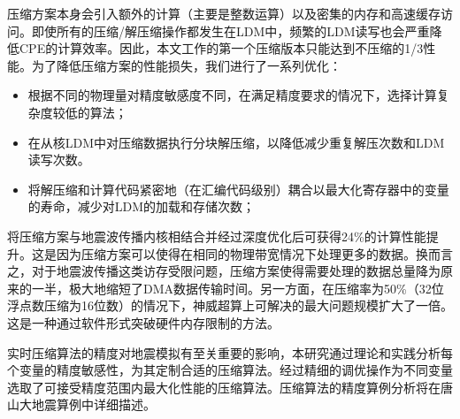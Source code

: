 压缩方案本身会引入额外的计算（主要是整数运算）以及密集的内存和高速缓存访问。即使所有的压缩/解压缩操作都发生在LDM中，频繁的LDM读写也会严重降低CPE的计算效率。因此，本文工作的第一个压缩版本只能达到不压缩的1/3性能。为了降低压缩方案的性能损失，我们进行了一系列优化：

\begin{itemize}
  \item 根据不同的物理量对精度敏感度不同，在满足精度要求的情况下，选择计算复杂度较低的算法；
  \item 在从核LDM中对压缩数据执行分块解压缩，以降低减少重复解压次数和LDM读写次数。
  \item 将解压缩和计算代码紧密地（在汇编代码级别）耦合以最大化寄存器中的变量的寿命，减少对LDM的加载和存储次数；
\end{itemize}

将压缩方案与地震波传播内核相结合并经过深度优化后可获得24\%的计算性能提升。这是因为压缩方案可以使得在相同的物理带宽情况下处理更多的数据。换而言之，对于地震波传播这类访存受限问题，压缩方案使得需要处理的数据总量降为原来的一半，极大地缩短了DMA数据传输时间。另一方面，在压缩率为50\%（32位浮点数压缩为16位数）的情况下，神威超算上可解决的最大问题规模扩大了一倍。这是一种通过软件形式突破硬件内存限制的方法。

实时压缩算法的精度对地震模拟有至关重要的影响，本研究通过理论和实践分析每个变量的精度敏感性，为其定制合适的压缩算法。经过精细的调优操作为不同变量选取了可接受精度范围内最大化性能的压缩算法。压缩算法的精度算例分析将在唐山大地震算例中详细描述。


